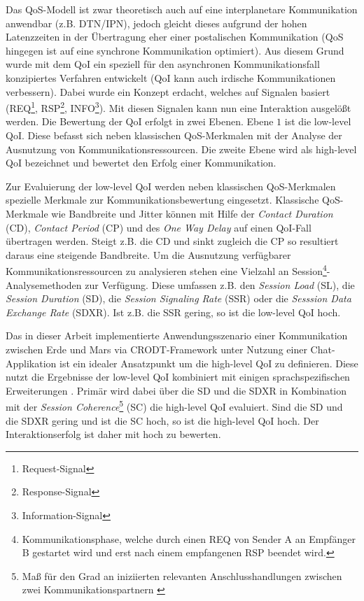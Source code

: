 Das \gls{QoS}-Modell ist zwar theoretisch auch auf eine interplanetare Kommunikation
anwendbar (z.B. \gls{DTN}/\gls{IPN}), jedoch gleicht dieses aufgrund der hohen
Latenzzeiten in der {\"U}bertragung eher einer postalischen Kommunikation (\gls{QoS} hingegen
ist auf eine synchrone Kommunikation optimiert). Aus diesem Grund wurde mit dem
\gls{QoI} ein speziell f{\"u}r den asynchronen
Kommunikationsfall konzipiertes Verfahren entwickelt \cite{Daher2} (\gls{QoI}
kann auch irdische Kommunikationen verbessern). Dabei wurde ein Konzept erdacht,
welches auf Signalen basiert (REQ\footnote{Request-Signal},
RSP\footnote{Response-Signal}, INFO\footnote{Information-Signal}). Mit diesen
Signalen kann nun eine Interaktion ausgel{\"o}{\ss}t werden. Die Bewertung der
\gls{QoI} erfolgt in zwei Ebenen. Ebene $1$ ist die low-level \gls{QoI}. Diese
befasst sich neben klassischen \gls{QoS}-Merkmalen mit der Analyse der Ausnutzung von
Kommunikationsressourcen. Die zweite Ebene wird als high-level \gls{QoI}
bezeichnet und bewertet den Erfolg einer Kommunikation.

Zur Evaluierung der low-level \gls{QoI} werden neben klassischen \gls{QoS}-Merkmalen
spezielle Merkmale zur Kommunikationsbewertung eingesetzt. Klassische
\gls{QoS}-Merkmale wie Bandbreite und Jitter k{\"o}nnen mit Hilfe der
\textit{Contact Duration} (CD), \textit{Contact Period} (CP) und des \textit{One
Way Delay} auf einen \gls{QoI}-Fall übertragen werden. Steigt z.B. die CD und
sinkt zugleich die CP so resultiert daraus eine steigende Bandbreite. Um die
Ausnutzung verf{\"u}gbarer Kommunikationsressourcen zu analysieren stehen eine
Vielzahl an Session\footnote{Kommunikationsphase, welche durch einen REQ von Sender A an
Empf{\"a}nger B gestartet wird und erst nach einem empfangenen RSP beendet
wird.}-Analysemethoden zur Verf{\"u}gung. Diese umfassen z.B. den
\textit{Session Load} (SL), die \textit{Session Duration} (SD), die
\textit{Session Signaling Rate} (SSR) oder die \textit{Sesssion Data Exchange Rate} (SDXR). Ist
z.B. die SSR gering, so ist die low-level \gls{QoI} hoch.

Das in dieser Arbeit implementierte Anwendungsszenario einer Kommunikation
zwischen Erde und Mars via \gls{CRODT}-Framework unter Nutzung einer
Chat-Applikation ist ein idealer Ansatzpunkt um die high-level \gls{QoI} zu
definieren. Diese nutzt die Ergebnisse der low-level \gls{QoI} kombiniert mit
einigen sprachspezifischen Erweiterungen \cite{Donick}. Prim{\"a}r wird dabei
{\"u}ber die SD und die SDXR in Kombination mit der \textit{Session
Coherence}\footnote{Ma{\ss} f{\"u}r den Grad an iniziierten relevanten
Anschlusshandlungen zwischen zwei Kommunikationspartnern \cite{Donick}} (SC) die
high-level \gls{QoI} evaluiert. Sind die SD und die SDXR gering und ist die SC hoch,
so ist die high-level \gls{QoI} hoch.
Der Interaktionserfolg ist daher mit hoch zu bewerten.

